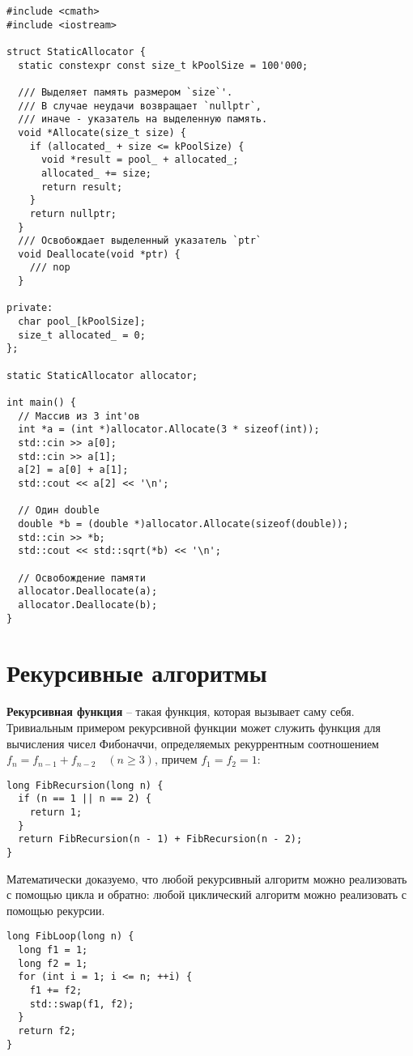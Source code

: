 \documentclass[14pt, a4paper]{extarticle}
\begin{document}
\begin{verbatim}
#include <cmath>
#include <iostream>

struct StaticAllocator {
  static constexpr const size_t kPoolSize = 100'000;

  /// Выделяет память размером `size`'.
  /// В случае неудачи возвращает `nullptr`,
  /// иначе - указатель на выделенную память.
  void *Allocate(size_t size) {
    if (allocated_ + size <= kPoolSize) {
      void *result = pool_ + allocated_;
      allocated_ += size;
      return result;
    }
    return nullptr;
  }
  /// Освобождает выделенный указатель `ptr`
  void Deallocate(void *ptr) {
    /// nop
  }

private:
  char pool_[kPoolSize];
  size_t allocated_ = 0;
};

static StaticAllocator allocator;

int main() {
  // Массив из 3 int'ов
  int *a = (int *)allocator.Allocate(3 * sizeof(int));
  std::cin >> a[0];
  std::cin >> a[1];
  a[2] = a[0] + a[1];
  std::cout << a[2] << '\n';

  // Один double
  double *b = (double *)allocator.Allocate(sizeof(double));
  std::cin >> *b;
  std::cout << std::sqrt(*b) << '\n';

  // Освобождение памяти
  allocator.Deallocate(a);
  allocator.Deallocate(b);
}
\end{verbatim}

\section{Рекурсивные алгоритмы}
\textbf{Рекурсивная функция} -- такая функция, которая вызывает саму себя.
Тривиальным примером рекурсивной функции может служить функция для вычисления
чисел Фибоначчи, определяемых рекуррентным соотношением $f_n = f_{n-1} + f_{n-2} \quad (n \geq 3)$, причем $f_1 = f_2 = 1$:
\begin{verbatim}
long FibRecursion(long n) {
  if (n == 1 || n == 2) {
    return 1;
  }
  return FibRecursion(n - 1) + FibRecursion(n - 2);
}  
\end{verbatim}

Математически доказуемо, что любой рекурсивный алгоритм можно реализовать с помощью цикла
и обратно: любой циклический алгоритм можно реализовать с помощью рекурсии.

\begin{verbatim}
long FibLoop(long n) {
  long f1 = 1;
  long f2 = 1;
  for (int i = 1; i <= n; ++i) {
    f1 += f2;
    std::swap(f1, f2);
  }
  return f2;
}
\end{verbatim}
\end{document}
